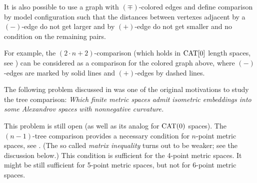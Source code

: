It is also possible to use a graph with $(\mp)$-colored edges and define comparison by model configuration such that the distances between vertexes adjacent by a $(-)$-edge do not get larger and by $(+)$-edge do not get smaller and no condition on the remaining pairs.

\begin{center}
\end{center}

For example, the $(2{\cdot}n+2)$-comparison (which holds in $\mathop{\rm CAT}\nolimits[0]$ length spaces, see \cite{AKP}) can be considered as a comparison for the colored graph above, where $(-)$-edges are marked by solid lines and $(+)$-edges by dashed lines.


The following problem discussed in \cite[7.1]{AKP} was one of the original motivations to study the tree comparison:
\emph{Which finite metric spaces admit isometric embeddings into some Alexandrov spaces with nonnegative curvature.}


This problem is still open (as well as its analog for $\mathop{\rm CAT}\nolimits(0)$ spaces).
The $(n-1)$-tree comparison provides a necessary condition for $n$-point metric spaces, see \cite[4.1]{AKP}.
(The so called \emph{matrix inequality} turns out to be weaker; see the discussion below.)
This condition is sufficient for the 4-point metric spaces.
It might be still sufficient for 5-point metric spaces,
but not for 6-point metric spaces.

